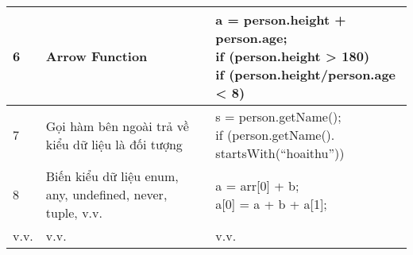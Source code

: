 \begin{longtable}{ |p{1cm}|p{7cm}|p{}|}
        \hline
        6 & Arrow Function  & \makecell[l]{a = person.height + person.age;\\
        if (person.height > 180)\\
        if (person.height/person.age <  8)} 
        \\ 
        \hline
        7 & Gọi hàm bên ngoài trả về kiểu dữ liệu là đối tượng & \makecell[l]{s = person.getName();\\
        if (person.getName().\\startsWith(“hoaithu”))} 
        \\
         \hline
        8 & Biến kiểu dữ liệu enum, any, undefined, never, tuple, v.v. &\makecell[l]{ a = arr[0] + b; \\
        a[0] = a + b + a[1];}  \\
        \hline
        v.v. & v.v. & v.v.
    \label{table:expressions_not_handle}
\end{longtable}